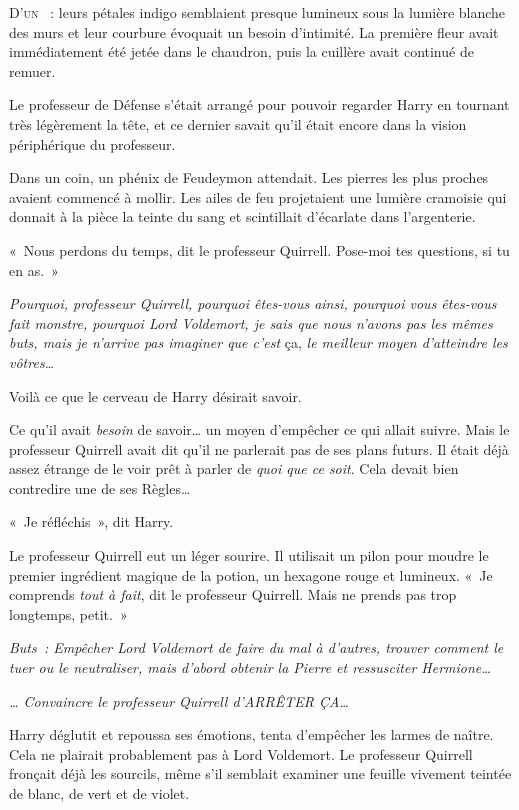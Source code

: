 
\lettrine{D}{'un} ~: leurs pétales indigo semblaient presque lumineux sous la lumière blanche des murs et leur courbure évoquait un besoin d'intimité. La première fleur avait immédiatement été jetée dans le chaudron, puis la cuillère avait continué de remuer.

Le professeur de Défense s'était arrangé pour pouvoir regarder Harry en tournant très légèrement la tête, et ce dernier savait qu'il était encore dans la vision périphérique du professeur.

Dans un coin, un phénix de Feudeymon attendait. Les pierres les plus proches avaient commencé à mollir. Les ailes de feu projetaient une lumière cramoisie qui donnait à la pièce la teinte du sang et scintillait d'écarlate dans l'argenterie.

«~Nous perdons du temps, dit le professeur Quirrell. Pose-moi tes questions, si tu en as.~»

\emph{Pourquoi, professeur Quirrell, pourquoi êtes-vous ainsi, pourquoi vous êtes-vous fait monstre, pourquoi Lord Voldemort, je sais que nous n'avons pas les mêmes buts, mais je n'arrive pas imaginer que c'est} ça, \emph{le meilleur moyen d'atteindre les vôtres…}

Voilà ce que le cerveau de Harry désirait savoir.

Ce qu'il avait \emph{besoin} de savoir… un moyen d'empêcher ce qui allait suivre. Mais le professeur Quirrell avait dit qu'il ne parlerait pas de ses plans futurs. Il était déjà assez étrange de le voir prêt à parler de \emph{quoi que ce soit}. Cela devait bien contredire une de ses Règles…

«~Je réfléchis~», dit Harry.

Le professeur Quirrell eut un léger sourire. Il utilisait un pilon pour moudre le premier ingrédient magique de la potion, un hexagone rouge et lumineux. «~Je comprends \emph{tout à fait}, dit le professeur Quirrell. Mais ne prends pas trop longtemps, petit.~»

\emph{Buts~: Empêcher Lord Voldemort de faire du mal à d'autres, trouver comment le tuer ou le neutraliser, mais d'abord obtenir la Pierre et ressusciter Hermione…}

\emph{… Convaincre le professeur Quirrell d'ARRÊTER ÇA…}

Harry déglutit et repoussa ses émotions, tenta d'empêcher les larmes de naître. Cela ne plairait probablement pas à Lord Voldemort. Le professeur Quirrell fronçait déjà les sourcils, même s'il semblait examiner une feuille vivement teintée de blanc, de vert et de violet.


